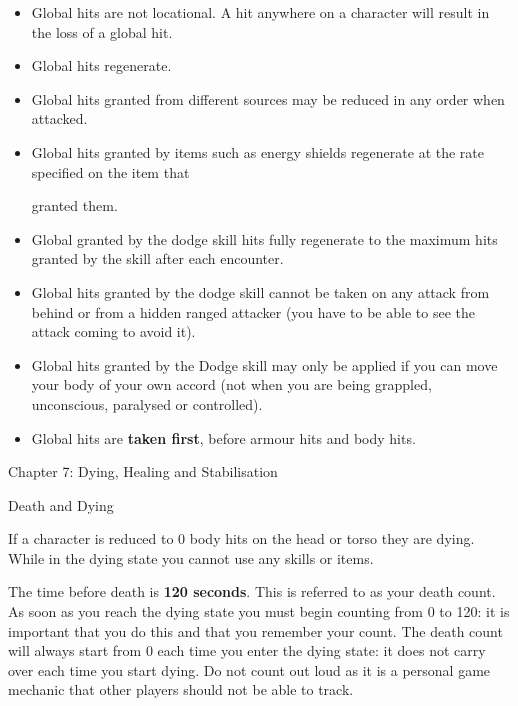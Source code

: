 \documentclass{scrbook}
\begin{document}
\begin{itemize}
\item Global hits are not locational. A hit anywhere on a character will result in the loss of a global hit.

\item Global hits regenerate.

\item Global hits granted from different sources may be reduced in any order when attacked.

\item Global hits granted by items such as energy shields regenerate at the rate specified on the item that

granted them.

\item Global granted by the dodge skill hits fully regenerate to the maximum hits granted by the skill after each encounter.

\item Global hits granted by the dodge skill cannot be taken on any attack from behind or from a hidden ranged attacker (you have to be able to see the attack coming to avoid it).

\item Global hits granted by the Dodge skill may only be applied if you can move your body of your own accord (not when you are being grappled, unconscious, paralysed or controlled).

\item Global hits are \textbf{taken first}, before armour hits and body hits.

\end{itemize}
Chapter 7: Dying, Healing and Stabilisation

Death and Dying

If a character is reduced to 0 body hits on the head or torso they are dying. While in the dying state you cannot use any skills or items.

The time before death is \textbf{120 seconds}. This is referred to as your death count. As soon as you reach the dying state you must begin counting from 0 to 120: it is important that you do this and that you remember your count. The death count will always start from 0 each time you enter the dying state: it does not carry over each time you start dying. Do not count out loud as it is a personal game mechanic that other players should not be able to track.
\end{document}
